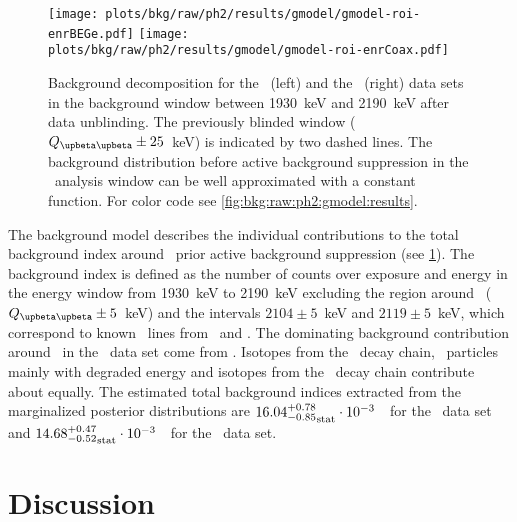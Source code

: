 \begin{figure}
  \centering
  \texttt{[image: plots/bkg/raw/ph2/results/gmodel/gmodel-roi-enrBEGe.pdf]}
  \hspace{12pt}
  \texttt{[image: plots/bkg/raw/ph2/results/gmodel/gmodel-roi-enrCoax.pdf]}
  \caption{%
    Background decomposition for the \enrBEGeII\ (left) and the \enrCoaxII\ (right) data
    sets in the background window between 1930~keV and 2190~keV after data unblinding. The
    previously blinded window ($\qbbM \pm 25$~keV) is indicated by two dashed lines.  The
    background distribution before active background suppression in the \onbb\ analysis
    window can be well approximated with a constant function. For color code see
    \cref{fig:bkg:raw:ph2:gmodel:results}.%
  }\label{fig:bkg:raw:ph2:gmodel:results:roi}
\end{figure}

The background model describes the individual contributions to the total background index
around \qbb\ prior active background suppression (see
\cref{fig:bkg:raw:ph2:gmodel:results:roi}).  The background index is defined as the number
of counts over exposure and energy in the energy window from 1930~keV to 2190~keV
excluding the region around \qbb\ ($\qbbM \pm 5$~keV) and the intervals $2104 \pm 5$~keV
and $2119 \pm 5$~keV, which correspond to known \g\ lines from \Tl\ and \Bih.
The dominating background contribution around \qbb\ in the \enrBEGeII\ data set come from
\kvz. Isotopes from the \Thh\ decay chain, \a\ particles mainly with degraded energy and
isotopes from the \Uh\ decay chain contribute about equally. The estimated total
background indices extracted from the marginalized posterior distributions are
${16.04^{+0.78}_{-0.85}}_\text{stat} \cdot 10^{-3}$~\ctsper\ for the \enrBEGeII\ data set and
${14.68^{+0.47}_{-0.52}}_\text{stat} \cdot 10^{-3}$~\ctsper\ for the \enrCoaxII\ data set.

\section{Discussion}%
\label{sec:bkg:raw:ph2:discussion}

